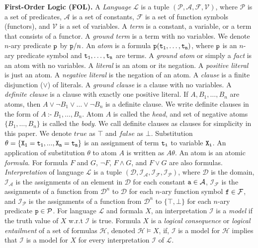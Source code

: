 \documentclass[
]{ceurart}
\begin{document}
	{\bf First-Order Logic (FOL).}
	A {\it Language} $\mathcal{L}$ is a tuple $(\mathcal{P}, \mathcal{A}, \mathcal{F}, \mathcal{V})$,
	where $\mathcal{P}$ is a set of predicates, $\mathcal{A}$ is a set of constants, $\mathcal{F}$ is a set of function symbols (functors), and $\mathcal{V}$ is a set of variables.
	A {\it term} is a constant, a variable, or a term that consists of a functor.
	A {\it ground term} is a term with no variables.
	We denote $n$-ary predicate ${\tt p}$ by ${\tt p}/n$.
	An {\it atom} is a formula ${\tt p(t_1, \ldots, t_n) }$, where ${\tt p}$ is an $n$-ary predicate symbol and ${\tt t_1, \ldots, t_n}$ are terms.
	A {\it ground atom} or simply a {\it fact} is an atom with no variables.
	A {\it literal} is an atom or its negation.
	A {\it positive literal} is just an atom. 
	A {\it negative literal} is the negation of an atom.
	A {\it clause} is a finite disjunction ($\lor$) of literals. 
	A {\it ground clause} is a clause with no variables.
	A {\it definite clause} is a clause with exactly one positive literal.
	If  $A, B_1, \ldots, B_n$ are atoms, then $ A \lor \lnot B_1 \lor \ldots \lor \lnot B_n$ is a definite clause.
	We write definite clauses in the form of $A~\mbox{:-}~B_1,\ldots,B_n$.
	Atom $A$ is called the {\it head}, and set of negative atoms $\{B_1, \ldots, B_n\}$ is called the {\it body}.
	We call definite clauses as clauses for simplicity in this paper.
	We denote $\mathit{true}$ as $\top$ and $\mathit{false}$ as $\bot$.
	Substitution $\theta = \{\tt X_1 = t_1, ..., X_n = t_n\}$ is an assignment of term ${\tt t_i}$ to variable ${\tt X_i}$. An application of substitution $\theta$ to atom $A$ is written as $A \theta$. An atom is an atomic \emph{formula}. For formula $F$ and $G$, $\lnot F$, $F \land G$, and $F \lor G$ are also formulas.
	\emph{Interpretation} of language $\mathcal{L}$ is a tuple $(\mathcal{D}, \mathcal{I}_\mathcal{A}, \mathcal{I}_\mathcal{F}, \mathcal{I}_\mathcal{P})$, 
	where $\mathcal{D}$ is the  domain, $\mathcal{I}_\mathcal{A}$ is the assignments of an element in $\mathcal{D}$ for each constant ${\tt a} \in \mathcal{A}$,
	$\mathcal{I}_\mathcal{F}$ is the assignments of a function from $\mathcal{D}^n$ to $\mathcal{D}$ for each $n$-ary function symbol ${\tt f} \in \mathcal{F}$, 
	and $\mathcal{I}_\mathcal{P}$ is the assignments of a function from $\mathcal{D}^n$ to $\{ \top, \bot \}$ for each $n$-ary predicate ${\tt p} \in \mathcal{P}$.
	For language $\mathcal{L}$ and formala $X$, an interpretation $\mathcal{I}$ is a \emph{model} if the truth value of $X$ w.r.t $\mathcal{I}$ is true.
	Formula $X$ is a \emph{logical consequence} or \emph{logical entailment} of a set of formulas $\mathcal{H}$, denoted $\mathcal{H} \models X$, if, $\mathcal{I}$ is a model for $\mathcal{H}$ implies that $\mathcal{I}$ is a model for $X$ for every interpretation $\mathcal{I}$ of $\mathcal{L}$.
	
\end{document}
